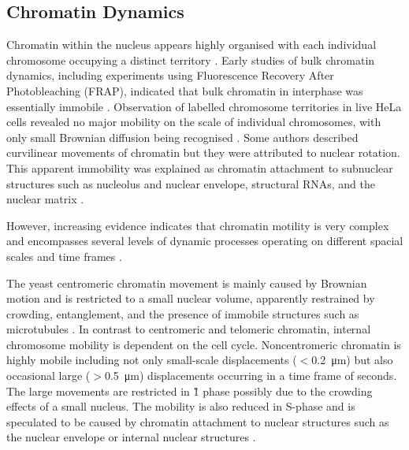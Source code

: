   \subsection{Chromatin Dynamics}
    Chromatin within the
    nucleus appears highly organised with each individual chromosome
    occupying a distinct territory \citep{cremer2006chromosome}.
    Early studies of bulk chromatin dynamics, including experiments
    using Fluorescence Recovery After Photobleaching (FRAP),
    indicated that bulk chromatin in interphase was
    essentially immobile \citep{abney1997chromatin}.  Observation of
    labelled chromosome territories in live HeLa cells revealed no
    major mobility on the scale of individual chromosomes, with only small
    Brownian diffusion being recognised \citep{edelmann2001morphology}.
    Some authors
    described curvilinear movements of chromatin but they were
    attributed to nuclear rotation.  This apparent immobility was
    explained as chromatin attachment to subnuclear structures
    such as nucleolus and nuclear envelope, structural RNAs, and the
    nuclear matrix \citep{de1986curvilinear, parvinen1976chromosome}.

    However, increasing evidence indicates that chromatin motility is
    very complex and encompasses several levels of dynamic processes
    operating on different spacial scales and time frames
    \citep{hubner2010chromatin}.

    The yeast 
    centromeric chromatin movement is mainly caused by
    Brownian motion and is restricted to a small nuclear volume,
    apparently restrained by
    crowding, entanglement, and the presence of immobile structures
    such as microtubules \citep{marshall1997interphase}.
    In contrast to
    centromeric and telomeric chromatin, internal chromosome mobility
    is dependent on the cell cycle. Noncentromeric chromatin is highly
    mobile including not only small-scale displacements
    ($<$\SI{0.2}{\micro\meter}) but also occasional large
    ($>$\SI{0.5}{\micro\meter}) displacements occurring in
    a time frame of seconds.
    The large movements are restricted in \G1 phase possibly due to
    the crowding effects of a small nucleus.  The mobility is also
    reduced in S-phase and is speculated to be caused by chromatin
    attachment to nuclear structures such as the nuclear envelope or
    internal nuclear structures \citep{heun2001chromosome}.

